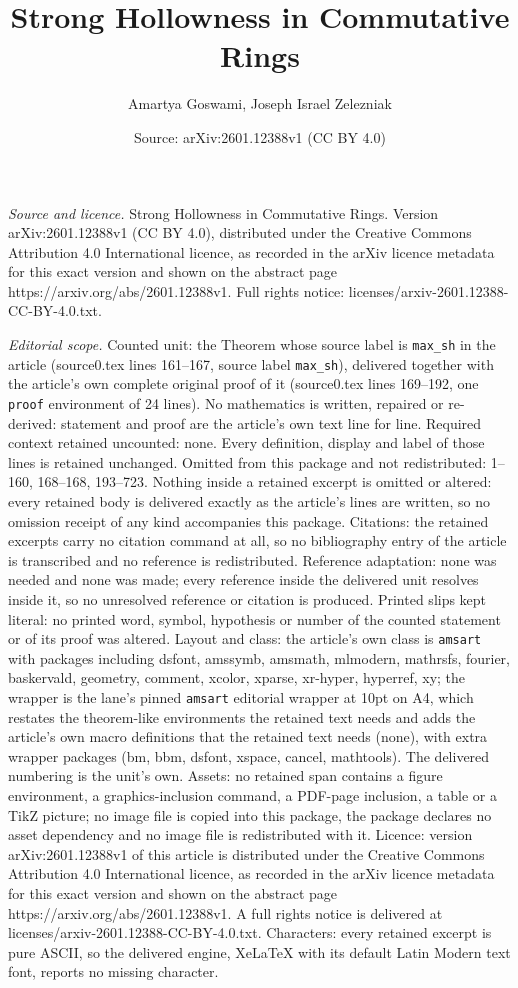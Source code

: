 \documentclass[10pt,a4paper]{amsart}
\title[Strong Hollowness in Commutative Rings]{Strong Hollowness in Commutative Rings}
\author{Amartya Goswami, Joseph Israel Zelezniak}
\date{Source: arXiv:2601.12388v1 (CC BY 4.0)}
\begin{document}
\maketitle

\noindent\emph{Source and licence.} Strong Hollowness in Commutative Rings. Version arXiv:2601.12388v1 (CC BY 4.0), distributed under the Creative Commons Attribution 4.0 International licence, as recorded in the arXiv licence metadata for this exact version and shown on the abstract page https://arxiv.org/abs/2601.12388v1. Full rights notice: licenses/arxiv-2601.12388-CC-BY-4.0.txt.\par\smallskip

\noindent\textit{Editorial scope.} Counted unit: the Theorem whose source label is \texttt{max\_sh} in the article (source0.tex lines 161--167, source label \texttt{max\_sh}), delivered together with the article's own complete original proof of it (source0.tex lines 169--192, one \texttt{proof} environment of 24 lines). No mathematics is written, repaired or re-derived: statement and proof are the article's own text line for line. Required context retained uncounted: none. Every definition, display and label of those lines is retained unchanged. Omitted from this package and not redistributed: 1--160, 168--168, 193--723. Nothing inside a retained excerpt is omitted or altered: every retained body is delivered exactly as the article's lines are written, so no omission receipt of any kind accompanies this package. Citations: the retained excerpts carry no citation command at all, so no bibliography entry of the article is transcribed and no reference is redistributed. Reference adaptation: none was needed and none was made; every reference inside the delivered unit resolves inside it, so no unresolved reference or citation is produced. Printed slips kept literal: no printed word, symbol, hypothesis or number of the counted statement or of its proof was altered. Layout and class: the article's own class is \texttt{amsart} with packages including dsfont, amssymb, amsmath, mlmodern, mathrsfs, fourier, baskervald, geometry, comment, xcolor, xparse, xr-hyper, hyperref, xy; the wrapper is the lane's pinned \texttt{amsart} editorial wrapper at 10pt on A4, which restates the theorem-like environments the retained text needs and adds the article's own macro definitions that the retained text needs (none), with extra wrapper packages (bm, bbm, dsfont, xspace, cancel, mathtools). The delivered numbering is the unit's own. Assets: no retained span contains a figure environment, a graphics-inclusion command, a PDF-page inclusion, a table or a TikZ picture; no image file is copied into this package, the package declares no asset dependency and no image file is redistributed with it. Licence: version arXiv:2601.12388v1 of this article is distributed under the Creative Commons Attribution 4.0 International licence, as recorded in the arXiv licence metadata for this exact version and shown on the abstract page https://arxiv.org/abs/2601.12388v1. A full rights notice is delivered at licenses/arxiv-2601.12388-CC-BY-4.0.txt. Characters: every retained excerpt is pure ASCII, so the delivered engine, XeLaTeX with its default Latin Modern text font, reports no missing character.
\end{document}
